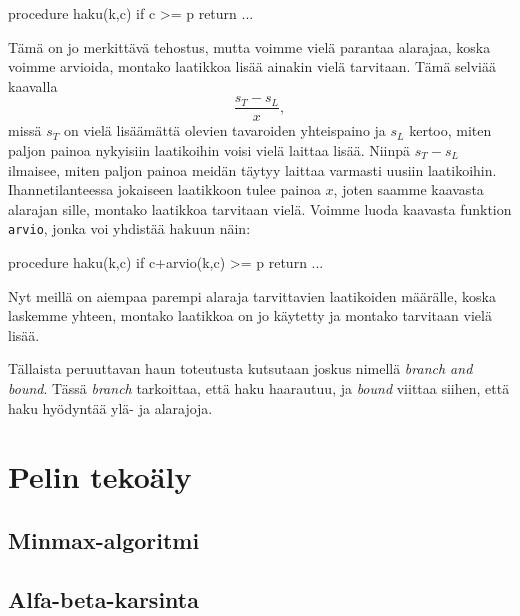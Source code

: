 \begin{code}
procedure haku(k,c)
    if c >= p
        return
    ...
\end{code}

Tämä on jo merkittävä tehostus, mutta voimme vielä parantaa
alarajaa, koska voimme arvioida, montako laatikkoa
lisää ainakin vielä tarvitaan. Tämä selviää kaavalla
\[
\frac{s_T-s_L}{x},
\]
missä $s_T$ on vielä lisäämättä olevien tavaroiden yhteispaino ja
$s_L$ kertoo, miten paljon painoa nykyisiin laatikoihin
voisi vielä laittaa lisää.
Niinpä $s_T-s_L$ ilmaisee, miten paljon painoa meidän täytyy
laittaa varmasti uusiin laatikoihin.
Ihannetilanteessa jokaiseen laatikkoon tulee painoa $x$,
joten saamme kaavasta alarajan sille, montako laatikkoa tarvitaan vielä.
Voimme luoda kaavasta funktion \texttt{arvio},
jonka voi yhdistää hakuun näin:

\begin{code}
procedure haku(k,c)
    if c+arvio(k,c) >= p
        return
    ...
\end{code}

Nyt meillä on aiempaa parempi alaraja tarvittavien laatikoiden määrälle,
koska laskemme yhteen, montako laatikkoa on jo käytetty ja montako
tarvitaan vielä lisää.

Tällaista peruuttavan haun toteutusta kutsutaan joskus nimellä
\emph{branch and bound}.
Tässä \emph{branch} tarkoittaa, että haku haarautuu,
ja \emph{bound} viittaa siihen, että haku hyödyntää
ylä- ja alarajoja.

\section{Pelin tekoäly}

\subsection{Minmax-algoritmi}

\subsection{Alfa-beta-karsinta}

